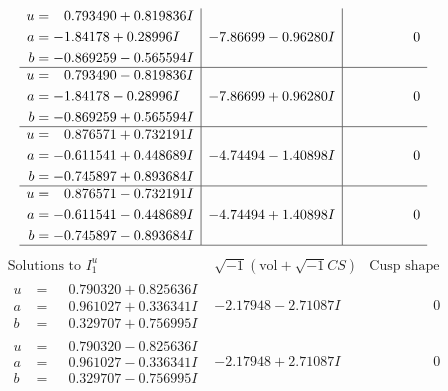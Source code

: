 \documentclass[1p]{elsarticle_modified}
\theoremstyle{definition}
\newcommand{\I}{\sqrt{-1}}
\begin{document}
$$\begin{array}{c|c|c}
\begin{aligned}
u &= \phantom{-}0.793490 + 0.819836 I \\
a &= -1.84178 + 0.28996 I \\
b &= -0.869259 - 0.565594 I\end{aligned}
 & -7.86699 - 0.96280 I & \phantom{-0.000000 } 0 \\ \hline\begin{aligned}
u &= \phantom{-}0.793490 - 0.819836 I \\
a &= -1.84178 - 0.28996 I \\
b &= -0.869259 + 0.565594 I\end{aligned}
 & -7.86699 + 0.96280 I & \phantom{-0.000000 } 0 \\ \hline\begin{aligned}
u &= \phantom{-}0.876571 + 0.732191 I \\
a &= -0.611541 + 0.448689 I \\
b &= -0.745897 + 0.893684 I\end{aligned}
 & -4.74494 - 1.40898 I & \phantom{-0.000000 } 0 \\ \hline\begin{aligned}
u &= \phantom{-}0.876571 - 0.732191 I \\
a &= -0.611541 - 0.448689 I \\
b &= -0.745897 - 0.893684 I\end{aligned}
 & -4.74494 + 1.40898 I & \phantom{-0.000000 } 0\\
 \hline 
 \end{array}$$\newpage$$\begin{array}{c|c|c}  
\text{Solutions to }I^u_{1}& \I (\text{vol} + \sqrt{-1}CS) & \text{Cusp shape}\\
 \hline 
\begin{aligned}
u &= \phantom{-}0.790320 + 0.825636 I \\
a &= \phantom{-}0.961027 + 0.336341 I \\
b &= \phantom{-}0.329707 + 0.756995 I\end{aligned}
 & -2.17948 - 2.71087 I & \phantom{-0.000000 } 0 \\ \hline\begin{aligned}
u &= \phantom{-}0.790320 - 0.825636 I \\
a &= \phantom{-}0.961027 - 0.336341 I \\
b &= \phantom{-}0.329707 - 0.756995 I\end{aligned}
 & -2.17948 + 2.71087 I & \phantom{-0.000000 } 0 \\ \hline\begin{aligned}

\end{aligned}
\end{array}$$
\end{document}
